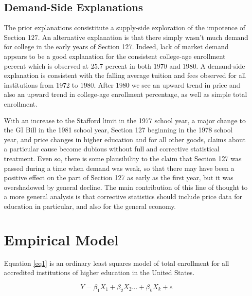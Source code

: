 \documentclass[review]{elsarticle}
\begin{document}
    \subsection{Demand-Side Explanations}
    The prior explanations consistitute a supply-side exploration of the impotence of Section 127.
    An alternative explanation is that there simply wasn't much demand for college in the early years of Section 127.
    Indeed, lack of market demand appears to be a good explanation for the consistent college-age enrollment percent
    which is observed at 25.7 percent in both 1970 and 1980.
    A demand-side explanation is consistent with the falling average tuition and fees observed for all institutions from 1972 to 1980.
    After 1980 we see an upward trend in price and also an upward trend in college-age enrollment percentage, as well as simple total enrollment.

    With an increase to the Stafford limit in the 1977 school year,
    a major change to the GI Bill in the 1981 school year,
    Section 127 beginning in the 1978 school year,
    and price changes in higher education and for all other goods,
    claims about a particular cause become dubious without full and corrective statistical treatment.
    Even so,
    there is some plausibility to the claim that Section 127 was passed during a time when demand was weak,
    so that there may have been a positive effect on the part of Section 127 as early as the first year,
    but it was overshadowed by general decline.
    The main contribution of this line of thought to a more general analysis is that corrective statistics should include price data
    for education in particular, and also for the general economy.

    \section{Empirical Model}

    Equation \ref{eq1} is an ordinary least squares model of total enrollment for all accredited institutions of higher education in the United States.

    \begin{equation}
        Y = \beta_1X_1+\beta_2X_2...+\beta_kX_k+e
        \label{eq1}
    \end{equation}
\end{document}
